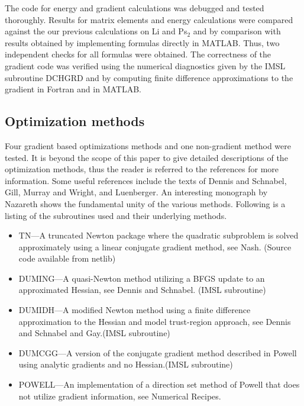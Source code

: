 \documentclass[12pt,thmsa,suthesis,verbatim]{report}
\begin{document}
The code for energy and gradient calculations was debugged and tested
thoroughly. Results for matrix elements and energy calculations were
compared against the our previous calculations on Li and Ps$_2$\cite
{Kinghorn93} and by comparison with results obtained by implementing
formulas directly in MATLAB. Thus, two independent checks for all formulas
were obtained. The correctness of the gradient code was verified using the
numerical diagnostics given by the IMSL subroutine DCHGRD and by computing
finite difference approximations to the gradient in Fortran and in MATLAB.

\subsection{Optimization methods}

Four gradient based optimizations methods and one non-gradient method were
tested. It is beyond the scope of this paper to give detailed descriptions
of the optimization methods, thus the reader is referred to the references
for more information. Some useful references include the texts of Dennis and
Schnabel\cite{DennisSchnabel83}, Gill, Murray and Wright\cite
{GillMurrayWright81}, and Luenberger\cite{Luenberger84}. An interesting
monograph by Nazareth\cite{Nazareth94} shows the fundamental unity of the
various methods. Following is a listing of the subroutines used and their
underlying methods.

\begin{itemize}
\item  TN---A truncated Newton package where the quadratic subproblem is
solved approximately using a linear conjugate gradient method, see Nash\cite
{NashTN}. (Source code available from netlib\cite{netlib})

\item  DUMING---A quasi-Newton method utilizing a BFGS update to an
approximated Hessian, see Dennis and Schnabel\cite{DennisSchnabel83}. (IMSL
subroutine)

\item  DUMIDH---A modified Newton method using a finite difference
approximation to the Hessian and model trust-region approach, see Dennis and
Schnabel\cite{DennisSchnabel83} and Gay\cite{Gay83}.(IMSL subroutine)

\item  DUMCGG---A version of the conjugate gradient method described in
Powell\cite{Powell77} using analytic gradients and no Hessian.(IMSL
subroutine)

\item  POWELL---An implementation of a direction set method of Powell that
does not utilize gradient information, see Numerical Recipes\cite
{NRinFortran}.
\end{itemize}
\end{document}

